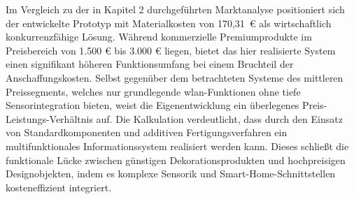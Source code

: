 Im Vergleich zu der in Kapitel 2 durchgeführten Marktanalyse positioniert sich der entwickelte Prototyp mit Materialkosten von 170,31~€ als wirtschaftlich konkurrenzfähige Lösung. 
Während kommerzielle Premiumprodukte im Preisbereich von 1.500 € bis 3.000 € liegen, bietet das hier realisierte System einen signifikant höheren Funktionsumfang bei einem Bruchteil der Anschaffungskosten. 
Selbst gegenüber dem betrachteten Systeme des mittleren Preissegments, welches nur grundlegende \gls{wlan}-Funktionen ohne tiefe Sensorintegration bieten, weist die Eigenentwicklung ein überlegenes Preis-Leistungs-Verhältnis auf. 
Die Kalkulation verdeutlicht, dass durch den Einsatz von Standardkomponenten und additiven Fertigungsverfahren ein multifunktionales Informationssystem realisiert werden kann. 
Dieses schließt die funktionale Lücke zwischen günstigen Dekorationsprodukten und hochpreisigen Designobjekten, indem es komplexe Sensorik und Smart-Home-Schnittstellen kosteneffizient integriert.